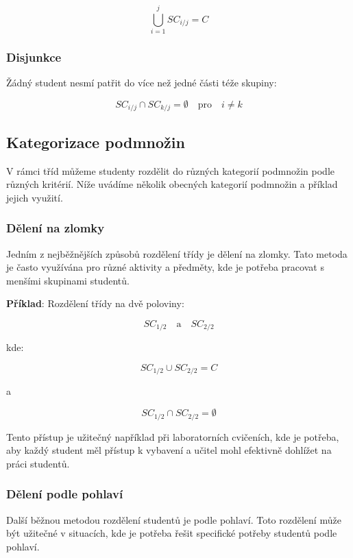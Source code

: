 \[
\bigcup_{i=1}^{j} SC_{i/j} = C
\]

\subsubsection*{Disjunkce}

Žádný student nesmí patřit do více než jedné části téže skupiny:

\[
SC_{i/j} \cap SC_{k/j} = \emptyset \quad \text{pro} \quad i \neq k
\]

\subsection*{Kategorizace podmnožin}

V rámci tříd můžeme studenty rozdělit do různých kategorií podmnožin podle různých kritérií. Níže uvádíme několik obecných kategorií podmnožin a příklad jejich využití.

\subsubsection*{Dělení na zlomky}

Jedním z nejběžnějších způsobů rozdělení třídy je dělení na zlomky. Tato metoda je často využívána pro různé aktivity a předměty, kde je potřeba pracovat s menšími skupinami studentů.

\setlength{\parindent}{0em}
\setlength{\parskip}{1em}
\textbf{Příklad}: Rozdělení třídy na dvě poloviny:

\[
SC_{1/2} \quad \text{a} \quad SC_{2/2}
\]

kde:

\[
SC_{1/2} \cup SC_{2/2} = C
\]

a

\[
SC_{1/2} \cap SC_{2/2} = \emptyset
\]

Tento přístup je užitečný například při laboratorních cvičeních, kde je potřeba, aby každý student měl přístup k vybavení a učitel mohl efektivně dohlížet na práci studentů.

\subsubsection*{Dělení podle pohlaví}

Další běžnou metodou rozdělení studentů je podle pohlaví. Toto rozdělení může být užitečné v situacích, kde je potřeba řešit specifické potřeby studentů podle pohlaví.

